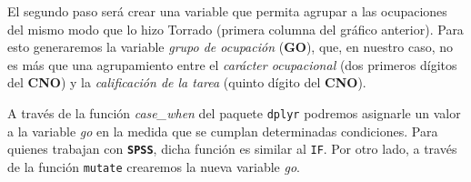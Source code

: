 \documentclass[
]{article}
\newenvironment{Shaded}{\begin{snugshade}}{\end{snugshade}}
\newcommand{\CommentTok}[1]{\textcolor[rgb]{0.56,0.35,0.01}{\textit{#1}}}
\newcommand{\DecValTok}[1]{\textcolor[rgb]{0.00,0.00,0.81}{#1}}
\newcommand{\FunctionTok}[1]{\textcolor[rgb]{0.13,0.29,0.53}{\textbf{#1}}}
\newcommand{\NormalTok}[1]{#1}
\newcommand{\OtherTok}[1]{\textcolor[rgb]{0.56,0.35,0.01}{#1}}
\newcommand{\SpecialCharTok}[1]{\textcolor[rgb]{0.81,0.36,0.00}{\textbf{#1}}}
\begin{document}
\begin{Shaded}
\end{Shaded}

El segundo paso será crear una variable que permita agrupar a las ocupaciones del mismo modo que lo hizo Torrado (primera columna del gráfico anterior). Para esto generaremos la variable \emph{grupo de ocupación} (\textbf{GO}), que, en nuestro caso, no es más que una agrupamiento entre el \emph{carácter ocupacional} (dos primeros dígitos del \textbf{CNO}) y la \emph{calificación de la tarea} (quinto dígito del \textbf{CNO}).

A través de la función \emph{case\_when} del paquete \texttt{dplyr} podremos asignarle un valor a la variable \emph{go} en la medida que se cumplan determinadas condiciones. Para quienes trabajan con \textbf{\texttt{SPSS}}, dicha función es similar al \texttt{IF}. Por otro lado, a través de la función \texttt{mutate} crearemos la nueva variable \emph{go}.
\end{document}
